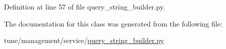 Definition at line 57 of file query\-\_\-string\-\_\-builder.\-py.



The documentation for this class was generated from the following file\-:\begin{DoxyCompactItemize}
\item 
tune/management/service/\hyperlink{query__string__builder_8py}{query\-\_\-string\-\_\-builder.\-py}\end{DoxyCompactItemize}
